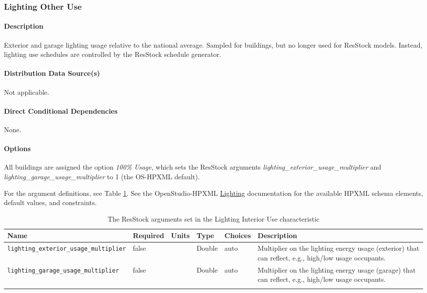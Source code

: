 \subsubsection{Lighting Other Use}\label{lighting_other_use}
\paragraph{Description}
Exterior and garage lighting usage relative to the national average. Sampled for buildings, but no longer used for ResStock models. Instead, lighting use schedules are controlled by the ResStock schedule generator. 

\paragraph{Distribution Data Source(s)}
Not applicable. 

\paragraph{Direct Conditional Dependencies}
None. 

\paragraph{Options}
All buildings are assigned the option \textit{100\% Usage}, which sets the ResStock arguments \textit{lighting\_exterior\_usage\_multiplier} and \textit{lighting\_garage\_usage\_multiplier}  to 1 (the OS-HPXML default).

For the argument definitions, see Table \ref{table:hc_arg_def_light_oth_use}. See the OpenStudio-HPXML \href{https://openstudio-hpxml.readthedocs.io/en/v1.8.1/workflow_inputs.html#hpxml-lighting}{Lighting} documentation for the available HPXML schema elements, default values, and constraints. 

\begin{longtable}[]{ |p{3.5cm}|p{1.5cm}|p{1cm}|p{1.1cm}|p{1.4cm}|p{5.5cm}|} \caption{The ResStock arguments set in the Lighting Interior Use characteristic} \label{table:hc_arg_def_light_oth_use}  \\
\toprule\noalign{}
Name & Required & Units & Type & Choices & Description \\
\midrule\noalign{}
\endhead
\bottomrule\noalign{}
\endlastfoot
\texttt{lighting\_exterior\_usage\_multiplier} & false & & Double & auto
& Multiplier on the lighting energy usage (exterior) that can reflect,
e.g., high/low usage occupants. \\
\hline
\texttt{lighting\_garage\_usage\_multiplier} & false & & Double & auto &
Multiplier on the lighting energy usage (garage) that can reflect, e.g.,
high/low usage occupants. \\
 \\
\end{longtable}

